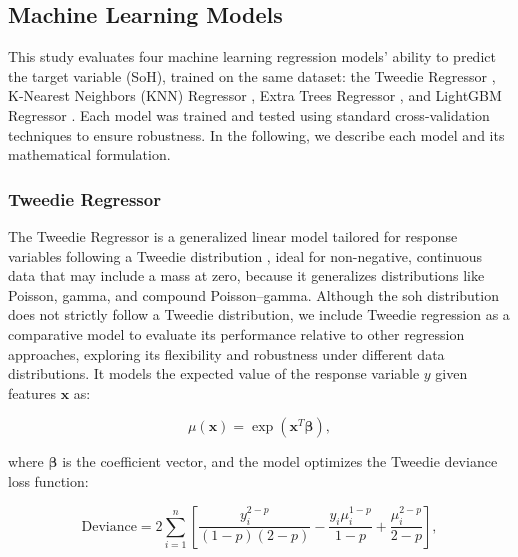\subsection{Machine Learning Models} \label{sec:ml_models}

This study evaluates four machine learning regression models' ability to predict the target variable (SoH), trained on the same dataset: the Tweedie Regressor \citep{tweedie1984index,jorgensen1997theory}, K-Nearest Neighbors (KNN) Regressor \citep{fix1951discriminatory,hastie2009elements}, Extra Trees Regressor \citep{geurts2006extremely}, and LightGBM Regressor \citep{ke2017lightgbm}. Each model was trained and tested using standard cross-validation techniques to ensure robustness. In the following, we describe each model and its mathematical formulation.

\subsubsection{Tweedie Regressor}

The Tweedie Regressor is a generalized linear model tailored for response variables following a Tweedie distribution \citep{tweedie1984index,jorgensen1997theory}, ideal for non-negative, continuous data that may include a mass at zero, because it generalizes distributions like Poisson, gamma, and compound Poisson–gamma. Although the \ac{soh} distribution does not strictly follow a Tweedie distribution, we include Tweedie regression as a comparative model to evaluate its performance relative to other regression approaches, exploring its flexibility and robustness under different data distributions. It models the expected value of the response variable \( y \) given features \( \mathbf{x} \) as:

\begin{equation}
 \mu(\mathbf{x}) = \exp(\mathbf{x}^T \boldsymbol{\beta}),   
\end{equation}

where \( \boldsymbol{\beta} \) is the coefficient vector, and the model optimizes the Tweedie deviance loss function:

\begin{equation}
\text{Deviance} = 2 \sum_{i=1}^n \left[ \frac{y_i^{2-p}}{(1-p)(2-p)} - \frac{y_i \mu_i^{1-p}}{1-p} + \frac{\mu_i^{2-p}}{2-p} \right],    
\end{equation}


